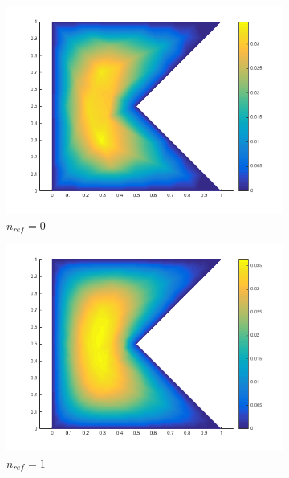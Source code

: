 \documentclass[10pt]{article}
\begin{document}
\begin{figure}[H]
        \centering
        \begin{subfigure}[b]{0.45\textwidth}
                \centering
                \includegraphics[width=\textwidth]{poly0.png}
                \caption{\(n_{ref}=0\)}
        \end{subfigure}%
        \begin{subfigure}[b]{0.45\textwidth}
                \centering
                \includegraphics[width=\textwidth]{poly1.png}
                \caption{\(n_{ref}=1\)}
        \end{subfigure}\\
        \begin{subfigure}[b]{0.45\textwidth}

\end{subfigure}
\end{figure}
\end{document}
